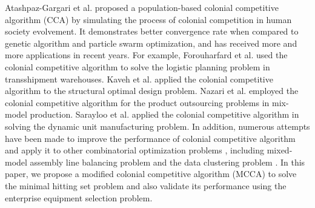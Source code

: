 Atashpaz-Gargari et al. \citep{c11} proposed a population-based colonial competitive algorithm (CCA) by simulating the process of colonial competition in human society evolvement.
It demonstrates better convergence rate when compared to genetic algorithm and particle swarm optimization, and has received more and more applications in recent years.
For example, Forouharfard et al. \citep{c12} used the colonial competitive algorithm to solve the logistic planning problem in transshipment warehouses.
Kaveh et al. \citep{c13} applied the colonial competitive algorithm to the structural optimal design problem.
Nazari et al. \citep{c14} employed the colonial competitive algorithm for the product outsourcing problems in mix-model production.
Sarayloo et al. \citep{c15} applied the colonial competitive algorithm in solving the dynamic unit manufacturing problem. 
In addition, numerous attempts have been made to improve the performance of colonial competitive algorithm and apply it to other combinatorial optimization problems \citep{c16}, including mixed-model assembly line balancing problem \citep{c17} and the data clustering problem \citep{c18}.
In this paper, we propose a modified colonial competitive algorithm (MCCA) to solve the minimal hitting set problem and also validate its performance using the enterprise equipment selection problem.